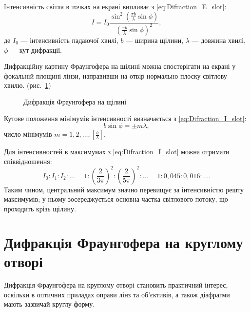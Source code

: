 Інтенсивність світла в точках на екрані випливає з \eqref{eq:Difraction_E_slot}:
\begin{equation}\label{eq:Difraction_I_slot}
    I = I_0 \frac{\sin^2\left( {\frac{\pi b}{\lambda} \sin\phi}\right)}{\left( \frac{\pi b}{\lambda} \sin\phi\right)^2},
\end{equation}
де $I_0$ --- інтенсивність падаючої хвилі, $b$ --- ширина щілини, $\lambda$ --- довжина хвилі, $\phi$ --- кут дифракції.


Дифракційну картину Фраунгофера на щілині можна спостерігати на екрані у фокальній площині лінзи, направивши на отвір нормально плоску світлову хвилю.
(рис.~\ref{pic:slot})

\begin{figure}[h!]\centering
    
    \caption{Дифракція Фраунгофера на щілині}
    \label{pic:slot}
\end{figure}



Кутове положення мінімумів інтенсивності визначається з \eqref{eq:Difraction_I_slot}:
\begin{equation}\label{eq:Difraction_Slot_min}
    b\sin\phi=\pm m\lambda,
\end{equation}
число мінімумів $m = 1, 2, \ldots, \left[ \frac{b}{\lambda}\right]$.

Для інтенсивностей в максимумах з  \eqref{eq:Difraction_I_slot} можна отримати співвідношення:
\begin{equation}\label{}
    I_0:I_1:I_2:\ldots = 1:\left(\frac{2}{3\pi}\right)^2:\left(\frac{2}{5\pi}\right)^2:\ldots = 1:0,045:0,016:\ldots.
\end{equation}
Таким чином, центральний максимум значно перевищує
за інтенсивністю решту максимумів; у ньому зосереджується
основна частка світлового потоку, що проходить крізь щілину.


\section{Дифракція Фраунгофера на круглому отворі}


Дифракція Фраунгофера на круглому отворі становить практичний інтерес, оскільки в оптичних приладах оправи лінз та об'єктивів, а також діафрагми мають зазвичай круглу форму.

